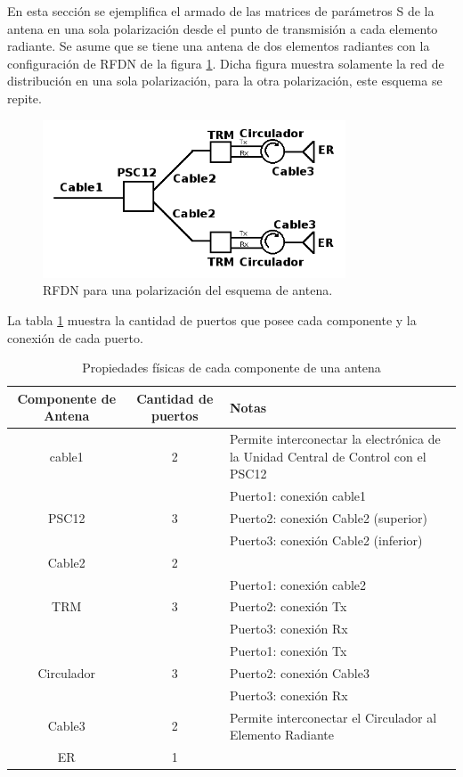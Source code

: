 En esta sección se ejemplifica el armado de las matrices de parámetros S de la antena en una sola polarización desde el punto 
de transmisión a cada elemento radiante. Se asume que se tiene una antena de dos elementos radiantes con la configuración de 
RFDN de la figura \ref{fig:antennaS}. Dicha figura muestra solamente la red de distribución en una sola polarización, para la 
otra polarización, este esquema se repite.

\begin{figure}[H]
 \centering
 \includegraphics[width=9cm]{gfx/RFDN.png}
 \caption{RFDN para una polarización del esquema de antena.}
 \label{fig:antennaS}
\end{figure}

La tabla \ref{tab:componentSParameters} muestra la cantidad de puertos que posee cada componente y la conexión de cada puerto.

\begin{table}[H]
  \footnotesize
  \centering
  \begin{tabular}{|c|c|p{6cm}|}
	\hline
	\textbf{Componente de Antena} & \textbf{Cantidad de puertos} & \textbf{Notas} \tabularnewline \hline
	cable1 &  2 & Permite interconectar la electrónica de la Unidad Central de Control con el PSC12 \tabularnewline \hline
	\multirow{3}{*}{PSC12} & & Puerto1: conexión cable1 \tabularnewline
	 & 3 & Puerto2: conexión Cable2 (superior) \tabularnewline
	 & & Puerto3: conexión Cable2 (inferior) \tabularnewline \hline
	Cable2 & 2 & \tabularnewline \hline
	\multirow{3}{*}{TRM} & & Puerto1: conexión cable2 \tabularnewline
	 & 3 & Puerto2: conexión Tx \tabularnewline
	 & & Puerto3: conexión Rx \tabularnewline \hline
	\multirow{3}{*}{Circulador} & & Puerto1: conexión Tx \tabularnewline
	 & 3 & Puerto2: conexión Cable3 \tabularnewline
	 & & Puerto3: conexión Rx \tabularnewline \hline
	Cable3 & 2 & Permite interconectar el Circulador al Elemento Radiante \tabularnewline \hline
	ER & 1 &   \tabularnewline \hline
  \end{tabular}
  \caption{Propiedades físicas de cada componente de una antena}
  \label{tab:componentSParameters}
\end{table}

